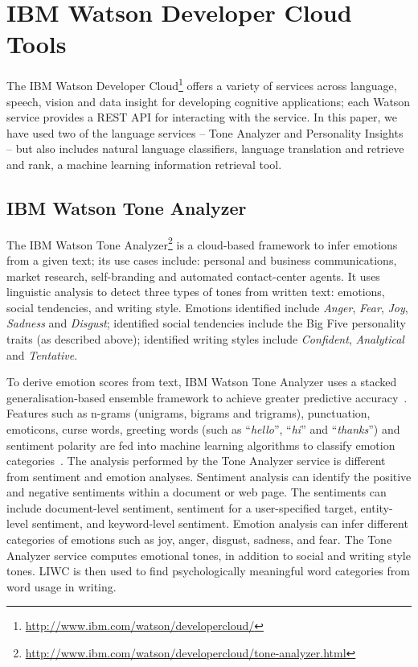 \documentclass[graybox]{svmult}
\begin{document}
\section{IBM Watson Developer Cloud Tools}\label{tools}

The IBM Watson Developer
Cloud\footnote{\url{http://www.ibm.com/watson/developercloud/}} offers
a variety of services across language, speech, vision and data insight
for developing cognitive applications; each Watson service provides a
REST API for interacting with the service. In this paper, we have used
two of the language services -- Tone Analyzer and Personality Insights
-- but also includes natural language classifiers, language
translation and retrieve and rank, a machine learning information
retrieval tool.

\subsection{IBM Watson Tone Analyzer}

The IBM Watson Tone
Analyzer\footnote{\url{http://www.ibm.com/watson/developercloud/tone-analyzer.html}}
is a cloud-based framework to infer emotions from a given text; its
use cases include: personal and business communications, market
research, self-branding and automated contact-center agents.  It uses
linguistic analysis to detect three types of tones from written text:
emotions, social tendencies, and writing style. Emotions identified
include {\emph{Anger}}, {\emph{Fear}}, {\emph{Joy}}, {\emph{Sadness}}
and {\emph{Disgust}}; identified social tendencies include the Big
Five personality traits (as described above); identified writing
styles include {\emph{Confident}}, {\emph{Analytical}} and
{\emph{Tentative}}.

To derive emotion scores from text, IBM Watson Tone Analyzer uses a
stacked generalisation-based ensemble framework to achieve greater
predictive accuracy~\citep{costa+mccrae:1992}.  Features such as
n-grams (unigrams, bigrams and trigrams), punctuation, emoticons,
curse words, greeting words (such as ``{\emph{hello}}'',
``{\emph{hi}}'' and ``{\emph{thanks}}'') and sentiment polarity are
fed into machine learning algorithms to classify emotion
categories~\citep{fellbaum:2006}. The analysis performed by the Tone
Analyzer service is different from sentiment and emotion
analyses. Sentiment analysis can identify the positive and negative
sentiments within a document or web page. The sentiments can include
document-level sentiment, sentiment for a user-specified target,
entity-level sentiment, and keyword-level sentiment. Emotion analysis
can infer different categories of emotions such as joy, anger,
disgust, sadness, and fear. The Tone Analyzer service computes
emotional tones, in addition to social and writing style tones. LIWC
is then used to find psychologically meaningful word categories from
word usage in writing.
\end{document}
